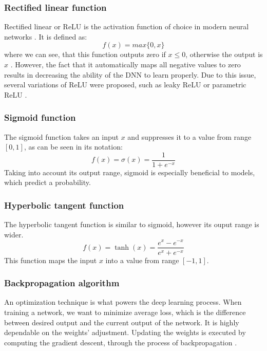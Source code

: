 \subsubsection*{Rectified linear function}
Rectified linear or ReLU is the activation function of choice in modern neural networks \cite{tutorialIEEE}. It is defined as:
\begin{equation}
     f(x) = max\{0, x\}
\end{equation}
where we can see, that this function outputs zero if $x\leq0$, otherwise the output is $x$ \cite{deeplearningbook}. However, the fact that it automatically maps all negative values to zero results in decreasing the ability of the DNN to learn properly. Due to this issue, several variations of ReLU were proposed, such as leaky ReLU or parametric ReLU \cite{tutorialIEEE}.

\subsubsection*{Sigmoid function}
The sigmoid function takes an input $x$ and suppresses it to a value from range $[0,1]$, as can be seen in its notation:
\begin{equation}
    f(x) = \sigma(x)=\frac{1}{1+e^{-x}}
\end{equation}
Taking into account its output range, sigmoid is especially beneficial to models, which predict a probability.

\subsubsection*{Hyperbolic tangent function}
The hyperbolic tangent function is similar to sigmoid, however its ouput range is wider. 
\begin{equation}
    f(x) = \tanh(x)=\frac{e^x-e^{-x}}{e^x+e^{-x}}
\end{equation}
This function maps the input $x$ into a value from range $[-1,1]$.
\subsubsection{Backpropagation algorithm}
An optimization technique is what powers the deep learning process. When training a network, we want to minimize average loss, which is the difference between desired output and the current output of the network. It is highly dependable on the weights' adjustment. Updating the weights is executed by computing the gradient descent, through the process of backpropagation \cite{tutorialIEEE}.

